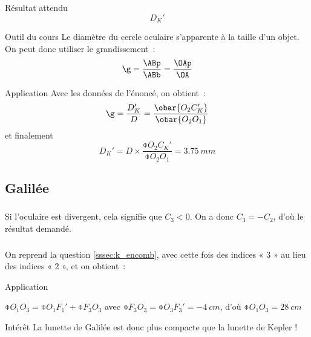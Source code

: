 \documentclass[a4paper, 12pt, final, garamond]{book}
\begin{document}
\subsubsection{}\label{sssec:k_diam}
\begin{tcbraster}[raster columns=6, raster equal height=rows]
    \begin{tcolorbox}[blankest, raster multicolumn=3]
        \begin{tcbraster}[raster columns=1]
            \begin{NCprop}[raster multicolumn=1]{Résultat attendu}
                $$D_K'$$
            \end{NCprop}
            \begin{NCrapp}[raster multicolumn=2]{Outil du cours}
                Le diamètre du cercle oculaire s'apparente à la taille d'un
                objet. On peut donc utiliser le grandissement~:
                \[ \g = \frac{\ABp}{\ABb} = \frac{\OAp}{\OA} \]
            \end{NCrapp}
        \end{tcbraster}
    \end{tcolorbox}
    \begin{NCexem}[raster multicolumn=3]{Application}
        Avec les données de l'énoncé, on obtient~:
        \[ \g = \frac{D_K'}{D} = \frac{\obar{O_2C_K'}}{\obar{O_2O_1}}\]
        et finalement
        \[ \boxed{D_K' = D\times \frac{\obar{O_2C_K'}}{\obar{O_2O_1}} =
        \SI{3.75}{mm}} \]
    \end{NCexem}
    
\end{tcbraster}

\subsection{Galilée}

\subsubsection{}
Si l'oculaire est divergent, cela signifie que $C_3 < 0$. On a donc $C_3 = -
C_2$, d'où le résultat demandé.

\subsubsection{}
On reprend la question \ref{sssec:k_encomb}, avec cette fois des indices « 3 »
au lieu des indices « 2 », et on obtient~:

\begin{tcbraster}[raster columns=2, raster equal height=rows]
    \begin{NCexem}{Application}

        $\obar{O_1O_3} = \obar{O_1F_1'} + \obar{F_3O_3}$ avec $\obar{F_3O_3} =
        \obar{O_3F_3'} = \SI{-4}{cm}$, d'où $\boxed{\obar{O_1O_3} =
        \SI{+28}{cm}}$

    \end{NCexem}
    \begin{inte}{Intérêt}
        La lunette de Galilée est donc plus compacte que la lunette de Kepler !
    \end{inte}
\end{tcbraster}
\vfill
\end{document}
